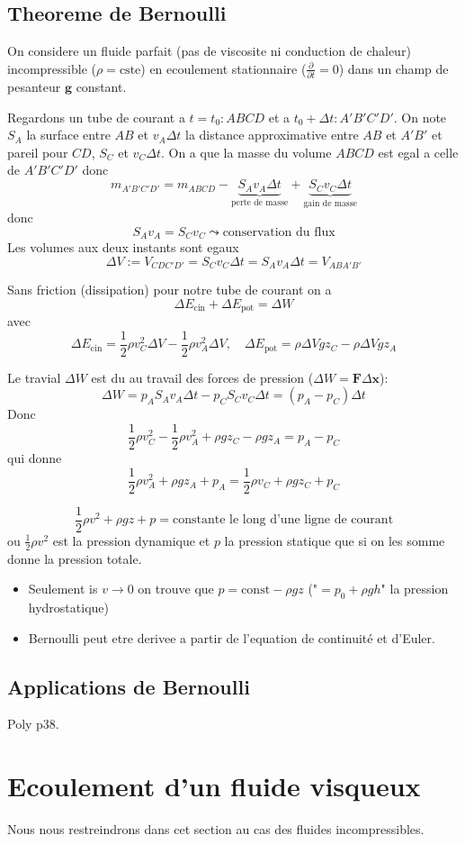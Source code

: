 \subsection{Theoreme de Bernoulli} 

On considere un fluide parfait (pas de viscosite ni conduction de chaleur) incompressible ($\rho=\mathrm{cste}$) en ecoulement stationnaire ($\frac{ \partial  }{ \partial t}=0$) dans un champ de pesanteur $\boldsymbol{g}$ constant. 

Regardons un tube de courant a $t=t_{0}:ABCD$ et a $t_{0}+\Delta t:A'B'C'D'$. On note $S_{A}$ la surface entre $AB$ et $v_{A}\Delta t$ la distance approximative entre $AB$ et $A'B'$ et pareil pour $CD$, $S_{C}$ et $v_{C}\Delta t$. On a que la masse du volume $ABCD$ est egal a celle de $A'B'C'D'$ donc 
$$
m_{A'B'C'D'}=m_{ABCD}-\underbrace{ S_{A}v_{A}\Delta t }_{ \text{perte de masse} }+\underbrace{ S_{C}v_{C}\Delta t }_{\text{gain de masse}}
$$
donc
$$
S_{A}v_{A}=S_{C}v_{C} \leadsto\text{conservation du flux}
$$
Les volumes aux deux instants sont egaux
$$
\Delta V:= V_{CDC'D'}=S_{C}v_{C}\Delta t=S_{A}v_{A}\Delta t=V_{ABA'B'}
$$

Sans friction (dissipation) pour notre tube de courant on a
$$
\Delta E_{\mathrm{cin}}+\Delta E_{\mathrm{pot}}=\Delta W
$$
avec 
$$
\Delta E_{\mathrm{cin}}=\frac{1}{2}\rho v_{C}^{2}\Delta V-\frac{1}{2}\rho v_{A}^{2}\Delta V,\quad\Delta E_{\mathrm{pot}}=\rho\Delta Vgz_{C}-\rho\Delta Vgz_{A}
$$

Le travial $\Delta W$ est du au travail des forces de pression ($\Delta W=\boldsymbol{F}\Delta \boldsymbol{x}$):
$$
\Delta W=p_{A}S_{A}v_{A}\Delta t-p_{C}S_{C}v_{C}\Delta t=(p_{A}-p_{C})\Delta t
$$
Donc
$$
\frac{1}{2}\rho v_{C}^{2}-\frac{1}{2}\rho v_{A}^{2}+\rho gz_{C}-\rho gz_{A}=p_{A}-p_{C}
$$
qui donne
$$
\frac{1}{2} \rho v_{A}^{2}+\rho gz_{A}+p_{A}=\frac{1}{2}\rho v_{C}+\rho gz_{C}+p_{C}
$$

\begin{theorem}
$$
\frac{1}{2}\rho v^{2}+\rho gz+p=\text{constante le long d'une ligne de courant}
$$
ou $\frac{1}{2}\rho v^{2}$ est la pression dynamique et $p$ la pression statique que si on les somme donne la pression totale.
\end{theorem}
\begin{remark}
\begin{itemize}
\item Seulement is $v \to 0$ on trouve que $p=\mathrm{const}-\rho gz$ ("$=p_{0}+\rho gh$" la pression hydrostatique)
\item Bernoulli peut etre derivee a partir de l'equation de continuité et d'Euler.
\end{itemize}
\end{remark}

\subsection{Applications de Bernoulli}

Poly p38.

\section{Ecoulement d'un fluide visqueux}

Nous nous restreindrons dans cet section au cas des fluides incompressibles.